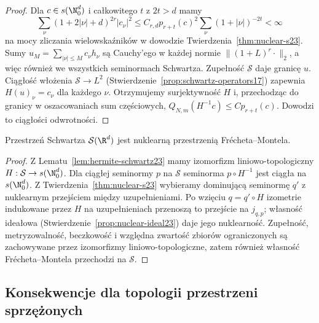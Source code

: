 \begin{proof}
Dla $c\in s(\N_0^d)$ i całkowitego $t$ z $2t>d$ mamy
\[
 \sum_\nu(1+2|\nu|+d)^{2r}|c_\nu|^2
 \le C_{r,d}p_{r+t}(c)^2
 \sum_\nu(1+|\nu|)^{-2t}<\infty
\]
na mocy zliczania wielowskaźników w dowodzie
Twierdzenia~\ref{thm:nuclear-s23}.
Sumy $u_M=\sum_{|\nu|\le M}c_\nu h_\nu$ są Cauchy'ego
w każdej normie $\|(1+L)^r\cdot\|_2$, a więc również
we wszystkich seminormach Schwartza. Zupełność
$\mathcal S$ daje granicę $u$. Ciągłość włożenia
$\mathcal S\to L^2$ (Stwierdzenie~\ref{prop:schwartz-operators17})
zapewnia $H(u)_\nu=c_\nu$ dla każdego $\nu$.
Otrzymujemy surjektywność $H$ i, przechodząc do granicy
w oszacowaniach sum częściowych,
$Q_{N,m}(H^{-1}c)\le C p_{r+t}(c)$.
Dowodzi to ciągłości odwrotności.
\end{proof}

\begin{wniosek}
\label{cor:nuclear-schwartz23}
Przestrzeń Schwartza $\mathcal S(\R^d)$ jest nuklearną
przestrzenią Frécheta--Montela.
\end{wniosek}
\begin{proof}
Z Lematu~\ref{lem:hermite-schwartz23} mamy izomorfizm
liniowo-topologiczny $H:\mathcal S\to s(\N_0^d)$.
Dla ciągłej seminormy $p$ na $\mathcal S$ seminorma
$p\circ H^{-1}$ jest ciągła na $s(\N_0^d)$.
Z Twierdzenia~\ref{thm:nuclear-s23} wybieramy dominującą
seminormę $q'$ z nuklearnym przejściem między
uzupełnieniami. Po wzięciu $q=q'\circ H$ izometrie
indukowane przez $H$ na uzupełnieniach przenoszą
to przejście na $j_{q,p}$; własność ideałowa
(Stwierdzenie~\ref{prop:nuclear-ideal23}) daje jego
nuklearność. Zupełność, metryzowalność, beczkowość
i względna zwartość zbiorów ograniczonych są zachowywane
przez izomorfizmy liniowo-topologiczne, zatem również
własność Frécheta--Montela przechodzi na $\mathcal S$.
\end{proof}

\subsection{Konsekwencje dla topologii przestrzeni sprzężonych}

